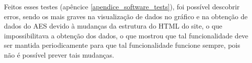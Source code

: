 Feitos esses testes (apêncice \ref{apendice_software_tests}), foi possível descobrir erros, sendo os mais graves na visualização de dados no gráfico e na obtenção de dados do AES devido à mudanças da estrutura do HTML do site, o que impossibilitava a obtenção dos dados, o que mostrou que tal funcionalidade deve ser mantida periodicamente para que tal funcionalidade funcione sempre, pois não é possível prever tais mudanças.